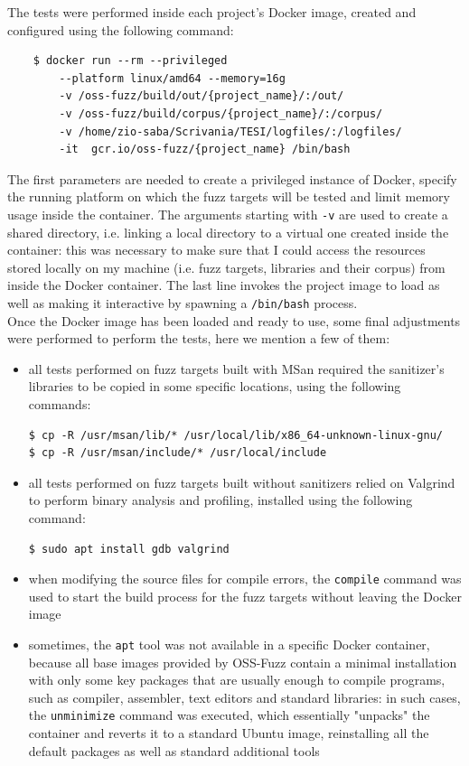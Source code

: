 \newpage
The tests were performed inside each project's Docker image, created and configured using the following command:
\begin{verbatim}
    $ docker run --rm --privileged 
        --platform linux/amd64 --memory=16g 
        -v /oss-fuzz/build/out/{project_name}/:/out/
        -v /oss-fuzz/build/corpus/{project_name}/:/corpus/    
        -v /home/zio-saba/Scrivania/TESI/logfiles/:/logfiles/ 
        -it  gcr.io/oss-fuzz/{project_name} /bin/bash
\end{verbatim}
The first parameters are needed to create a privileged instance of Docker, specify the running platform on which the fuzz targets will be tested and limit memory usage inside the container. The arguments starting with \verb|-v| are used to create a shared directory, i.e. linking a local directory to a virtual one created inside the container: this was necessary to make sure that I could access the resources stored locally on my machine (i.e. fuzz targets, libraries and their corpus) from inside the Docker container. The last line invokes the project image to load as well as making it interactive by spawning a \verb|/bin/bash| process.
\ \\

Once the Docker image has been loaded and ready to use, some final adjustments were performed to perform the tests, here we mention a few of them:
\begin{itemize}
    \item all tests performed on fuzz targets built with MSan required the sanitizer's libraries to be copied in some specific locations, using the following commands:
\begin{verbatim}
$ cp -R /usr/msan/lib/* /usr/local/lib/x86_64-unknown-linux-gnu/
$ cp -R /usr/msan/include/* /usr/local/include
\end{verbatim}
    \item all tests performed on fuzz targets built without sanitizers relied on Valgrind to perform binary analysis and profiling, installed using the following command:
\begin{verbatim}
$ sudo apt install gdb valgrind
\end{verbatim} 
    \item when modifying the source files for compile errors, the \verb|compile| command was used to start the build process for the fuzz targets without leaving the Docker image
    \item sometimes, the \verb|apt| tool was not available in a specific Docker container, because all base images provided by OSS-Fuzz contain a minimal installation with only some key packages that are usually enough to compile programs, such as compiler, assembler, text editors and standard libraries: in such cases, the \verb|unminimize| command was executed, which essentially "unpacks" the container and reverts it to a standard Ubuntu image, reinstalling all the default packages as well as standard additional tools
\end{itemize}


